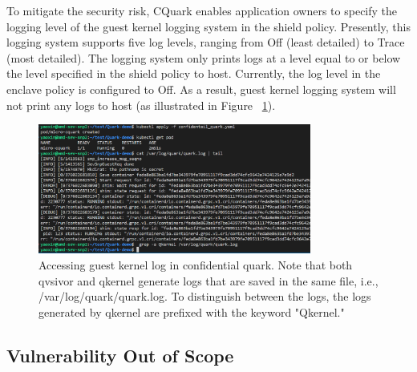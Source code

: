 To mitigate the security risk, CQuark enables application owners to specify the logging level of the guest kernel logging system in the shield policy. Presently, this logging system supports five log levels, ranging from Off (least detailed) to Trace (most detailed). The logging system only prints 
logs at a level equal to or below the level specified in the shield policy to host.  Currently, the log level in the enclave policy is configured to Off. As a result, guest kernel logging system will not print any logs to host (as illustrated in Figure ~\ref{fig:cquark_qkernel_log}).
\begin{figure}[H]
    \centering
    \includegraphics[width=0.8\textwidth]{images/cquark_qkernel_log.png}
    \caption[Accessing guest kernel log in confidential quark]{Accessing guest kernel log in confidential quark.  Note that both qvsivor and qkernel generate logs that are saved in the same file, i.e., /var/log/quark/quark.log. To distinguish between the logs, the logs generated by qkernel are prefixed with the keyword "Qkernel."}
    \label{fig:cquark_qkernel_log}
\end{figure}



\subsection{Vulnerability Out of Scope}




